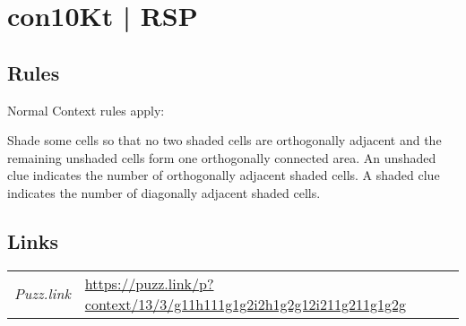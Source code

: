 \section[con10Kt | RSP {[\emph{Context}]}]{con10Kt | {\normalfont RSP}}
\label{sec:37-con10kt-rsp}

\subsection*{Rules}
\begin{markdown}
Normal Context rules apply:



Shade some cells so that no two shaded cells are orthogonally adjacent and the remaining unshaded cells form one orthogonally connected area. An unshaded clue indicates the number of orthogonally adjacent shaded cells. A shaded clue indicates the number of diagonally adjacent shaded cells.
\end{markdown}
\subsection*{Links}
\begin{tabularx}{\textwidth}{l X}
\emph{Puzz.link} & \url{https://puzz.link/p?context/13/3/g11h111g1g2i2h1g2g12i211g211g1g2g} \\
\end{tabularx}
\pagebreak
